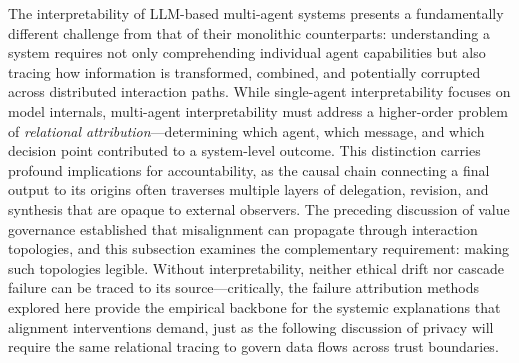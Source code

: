 \documentclass[11pt,a4paper]{article}
\begin{document}
The interpretability of LLM-based multi-agent systems presents a fundamentally different challenge from that of their monolithic counterparts: understanding a system requires not only comprehending individual agent capabilities but also tracing how information is transformed, combined, and potentially corrupted across distributed interaction paths. While single-agent interpretability focuses on model internals, multi-agent interpretability must address a higher-order problem of \emph{relational attribution}---determining which agent, which message, and which decision point contributed to a system-level outcome. This distinction carries profound implications for accountability, as the causal chain connecting a final output to its origins often traverses multiple layers of delegation, revision, and synthesis that are opaque to external observers. The preceding discussion of value governance established that misalignment can propagate through interaction topologies, and this subsection examines the complementary requirement: making such topologies legible. Without interpretability, neither ethical drift nor cascade failure can be traced to its source---critically, the failure attribution methods explored here provide the empirical backbone for the systemic explanations that alignment interventions demand, just as the following discussion of privacy will require the same relational tracing to govern data flows across trust boundaries.
\end{document}
